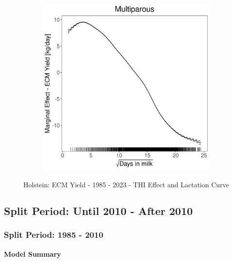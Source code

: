 \begin{figure}[H]
\begin{subfigure}[b]{0.45\textwidth}
    \end{subfigure}
    \hspace{0.05\textwidth} %
    \begin{subfigure}[b]{0.45\textwidth}
        \centering
        \includegraphics[width=\textwidth]{thesis/figures/models/ecm/full/ho_ecm_full/ho_ecm_full_marginal_dim_milk_multi.png}
    \end{subfigure}
    \caption[]{Holstein: ECM Yield - 1985 - 2023 - THI Effect and Lactation Curve}
    \label{fig:main}
\end{figure}


\subsection{Split Period: Until 2010 - After 2010}
\subsubsection{Split Period: 1985 - 2010}\label{model:ho_ecm_before}

\paragraph{Model Summary} \quad \\

